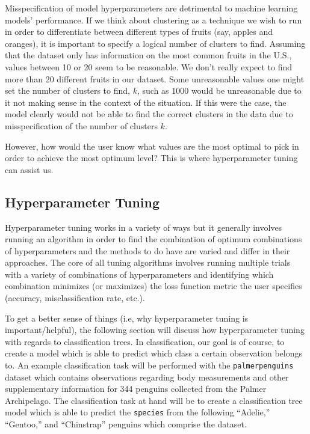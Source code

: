 \documentclass[12pt]{article}
\begin{document}
Misspecification of model hyperparameters are detrimental to machine
learning models' performance. If we think about clustering as a
technique we wish to run in order to differentiate between different
types of fruits (say, apples and oranges), it is important to specify a
logical number of clusters to find. Assuming that the dataset only has
information on the most common fruits in the U.S., values between 10 or
20 seem to be reasonable. We don't really expect to find more than 20
different fruits in our dataset. Some unreasonable values one might set
the number of clusters to find, \(k\), such as 1000 would be
unreasonable due to it not making sense in the context of the situation.
If this were the case, the model clearly would not be able to find the
correct clusters in the data due to misspecification of the number of
clusters \(k\).

However, how would the user know what values are the most optimal to
pick in order to achieve the most optimum level? This is where
hyperparameter tuning can assist us.

\hypertarget{hyperparameter-tuning}{%
\subsection{Hyperparameter Tuning}\label{hyperparameter-tuning}}

\label{sec:tuning}

Hyperparameter tuning works in a variety of ways but it generally
involves running an algorithm in order to find the combination of
optimum combinations of hyperparameters and the methods to do have are
varied and differ in their approaches. The core of all tuning algorithms
involves running multiple trials with a variety of combinations of
hyperparameters and identifying which combination minimizes (or
maximizes) the loss function metric the user specifies (accuracy,
misclassification rate, etc.).

To get a better sense of things (i.e, why hyperparameter tuning is
important/helpful), the following section will discuss how
hyperparameter tuning with regards to classification trees. In
classification, our goal is of course, to create a model which is able
to predict which class a certain observation belongs to. An example
classification task will be performed with the \texttt{palmerpenguins}
dataset which contains observations regarding body measurements and
other supplementary information for 344 penguins collected from the
Palmer Archipelago. The classification task at hand will be to create a
classification tree model which is able to predict the \texttt{species}
from the following ``Adelie,'' ``Gentoo,'' and ``Chinstrap'' penguins
which comprise the dataset.
\end{document}
